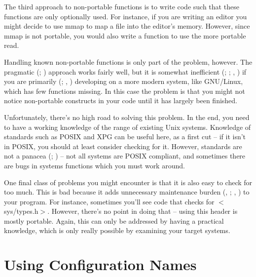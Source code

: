 The third approach to non-portable functions is to write code such that 
these functions are only optionally used. For instance, if you are writing 
an editor you might decide to use mmap to map a file into the editor's memory.
However, since mmap is not portable,
you would also write a function to use the more portable read. 


Handling known non-portable functions is only part of the problem, however.
The pragmatic ({\MaQ{}}; {\MaQ{}}) approach works fairly well, but it is somewhat 
inefficient ({\MbQ{}}; {\MbQ{}}; {\MbQ{}}, {\MaQ{}}) if you 
are primarily ({\McQ{}}; {\McQ{}}, {\MaQ{}}) developing on a more modern system, like GNU/Linux, which has few functions missing. In this case the problem is that you might not notice non-portable constructs in your code until it has largely been finished. 


Unfortunately, there's no high road to solving this problem. In the end, you 
need to have a working knowledge of the range of existing Unix systems.
Knowledge of standards such as POSIX and XPG can be useful here, as a 
first cut -- if it isn't in POSIX, you should at least consider checking for it.
However, standards are not a panacea ({\McQ{}}; {\McQ{}}) -- not all systems 
are POSIX compliant,
and sometimes there are bugs in systems functions which you must work around. 


One final class of problems you might encounter is that it is also easy to 
check for too much. This is bad because it adds unnecessary maintenance 
burden ({\McQ{}}, {\McQ{}}; {\McQ{}}, {\MgQ{}}) to your program. For instance, sometimes 
you'll see code that checks for $<$sys/types.h$>$. However, there's no point 
in doing that -- using this header is mostly portable. Again, this can only be 
addressed by having a practical knowledge, which is only really possible by 
examining your target systems. 

\section{Using Configuration Names}

